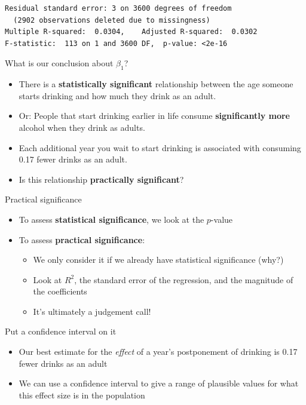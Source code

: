 \documentclass{beamer}\usepackage[]{graphicx}\usepackage[]{color}
\makeatletter
\newenvironment{kframe}{%
 \def\at@end@of@kframe{}%
 \ifinner\ifhmode%
  \def\at@end@of@kframe{\end{minipage}}%
  \begin{minipage}{\columnwidth}%
 \fi\fi%
 \def\FrameCommand##1{\hskip\@totalleftmargin \hskip-\fboxsep
 \colorbox{shadecolor}{##1}\hskip-\fboxsep
     \hskip-\linewidth \hskip-\@totalleftmargin \hskip\columnwidth}%
 \MakeFramed {\advance\hsize-\width
   \@totalleftmargin\z@ \linewidth\hsize
   \@setminipage}}%
 {\par\unskip\endMakeFramed%
 \at@end@of@kframe}
\newenvironment{knitrout}{}{} %
\makeatother
\begin{document}
\begin{darkframes}
\begin{frame}[fragile]
\begin{knitrout}
\begin{kframe}
\begin{verbatim}
Residual standard error: 3 on 3600 degrees of freedom
  (2902 observations deleted due to missingness)
Multiple R-squared:  0.0304,	Adjusted R-squared:  0.0302 
F-statistic:  113 on 1 and 3600 DF,  p-value: <2e-16
\end{verbatim}
\end{kframe}
\end{knitrout}
    \end{frame}

    \begin{frame}{What is our conclusion about $\beta_1$?}
      \begin{itemize}[<+->]
        \item There is a \textbf{statistically significant} relationship between the age someone starts drinking and how much they drink as an adult.
        \item Or: People that start drinking earlier in life consume \textbf{significantly more} alcohol when they drink as adults.
        \item Each additional year you wait to start drinking is associated with consuming 0.17 fewer drinks as an adult.
        \item Is this relationship \textbf{practically significant}?
      \end{itemize}
    \end{frame}

    \begin{frame}{Practical significance}
      \begin{itemize}
        \item To assess \textbf{statistical significance}, we look at the $p$-value
        \item To assess \textbf{practical significance}:
          \begin{itemize}
            \item We only consider it if we already have statistical significance (why?)
            \item Look at $R^2$, the standard error of the regression, and the magnitude of the coefficients
            \item It's ultimately a judgement call!
          \end{itemize}
      \end{itemize}
    \end{frame}

    \begin{frame}{Put a confidence interval on it}
      \begin{itemize}[<+->]
        \item Our best estimate for the \emph{effect} of a year's postponement of drinking is 0.17 fewer drinks as an adult
        \item We can use a confidence interval to give a range of plausible values for what this effect size is in the population
      \end{itemize}
    \end{frame}


\end{darkframes}
\end{document}
